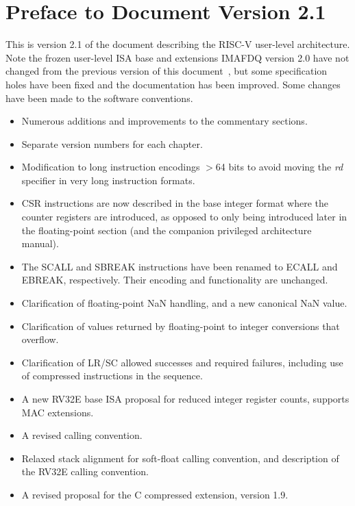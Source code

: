 \FloatBarrier

\section*{Preface to Document Version 2.1}

This is version 2.1 of the document describing the RISC-V user-level
architecture.  Note the frozen user-level ISA base and extensions
IMAFDQ version 2.0 have not changed from the previous version of this
document~\cite{riscvtr2}, but some specification holes have been fixed
and the documentation has been improved.  Some changes have been made
to the software conventions.
\begin{itemize}
\parskip 0pt
\itemsep 1pt
\item Numerous additions and improvements to the commentary sections.
\item Separate version numbers for each chapter.
\item Modification to long instruction encodings $>$64 bits to avoid
  moving the {\em rd} specifier in very long instruction formats.
\item CSR instructions are now described in the base integer format
  where the counter registers are introduced, as opposed to only being
  introduced later in the floating-point section (and the companion
  privileged architecture manual).
\item The SCALL and SBREAK instructions have been renamed to ECALL and
  EBREAK, respectively.  Their encoding and functionality are unchanged.
\item Clarification of floating-point NaN handling, and a new canonical NaN
  value.
\item Clarification of values returned by floating-point to integer
  conversions that overflow.
\item Clarification of LR/SC allowed successes and required failures,
  including use of compressed instructions in the sequence.
\item A new RV32E base ISA proposal for reduced integer register
  counts, supports MAC extensions.
\item A revised calling convention.
\item Relaxed stack alignment for soft-float calling convention, and
  description of the RV32E calling convention.
\item A revised proposal for the C compressed extension, version 1.9.
\end{itemize}

